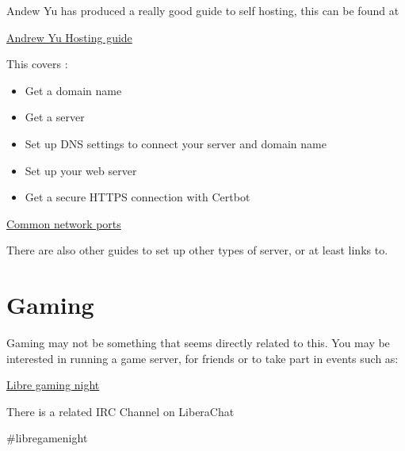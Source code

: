 \documentclass{extbook}
\begin{document}
Andew Yu has produced a really good guide to self hosting,  this can be found at

\href{https://host.andrewyu.org/}{Andrew Yu Hosting guide}

This covers :

\begin{itemize}
\item Get a domain name
\item Get a server
\item Set up DNS settings to connect your server and domain name
\item Set up your web server
\item Get a secure HTTPS connection with Certbot
\end{itemize}

\href{https://networkverge.com/common-ports/}{Common network ports}

There are also other guides to set up other types of server, or at least links to.   

\section{Gaming}

Gaming may not be something that seems directly related to this.  You may be interested in running a game server, for friends or to take part in events such as: 

\href{https://libregaming.org/}{Libre gaming night}

There is a related IRC Channel on LiberaChat 

\#libregamenight
\end{document}
